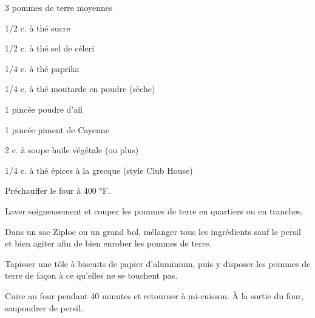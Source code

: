 %
%   
%   
%   
%




\totaltime{}


\begin{ingredients}
    \item 3 pommes de terre moyennes
    \item 1/2 c. à thé sucre
    \item 1/2 c. à thé sel de céleri
    \item 1/4 c. à thé paprika
    \item 1/4 c. à thé moutarde en poudre (sèche)
    \item 1 pincée poudre d'ail
    \item 1 pincée piment de Cayenne
    \item 2 c. à soupe huile végétale (ou plus)
    \item 1/4 c. à thé épices à la grecque (style Club House)
\end{ingredients}

\begin{steps}
    \item Préchauffer le four à 400 °F.
    \item Laver soigneusement et couper les pommes de terre en quartiers ou en tranches.
    \item Dans un sac Ziploc ou un grand bol, mélanger tous les ingrédients sauf le persil et bien agiter afin de bien enrober les pommes de terre.
    \item Tapisser une tôle à biscuits de papier d'aluminium, puis y disposer les pommes de terre de façon à ce qu'elles ne se touchent pas.
    \item Cuire au four pendant 40 minutes et retourner à mi-cuisson. À la sortie du four, saupoudrer de persil.
\end{steps}
